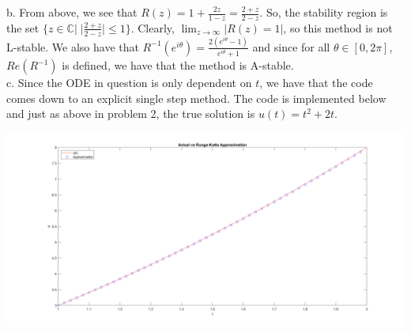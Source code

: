 \begin{solution}
    b. From above, we see that $R(z)=1+\frac{2z}{1-z}=\frac{2+z}{2-z}$. So, the stability region is the
    set $\{z\in\mathbb{C}|\;|\frac{2+z}{2-z}|\leq1\}$. Clearly, $\lim_{z\rightarrow\infty}|R(z)=1|$, so
    this method is not L-stable. We also have that
    $R^{-1}(e^{i\theta})=\frac{2(e^{i\theta}-1)}{e^{i\theta}+1}$ and since for all $\theta\in[0,2\pi]$,
    $Re(R^{-1})$ is defined, we have that the method is A-stable.\\

    c. Since the ODE in question is only dependent on $t$, we have that the code comes down to an
    explicit single step method. The code is implemented below and just as above in problem 2, the true
    solution is $u(t)=t^2+2t$.

    \begin{center}
    \includegraphics[scale=0.15]{3.PNG}
    \end{center}

\end{solution}

\newpage
